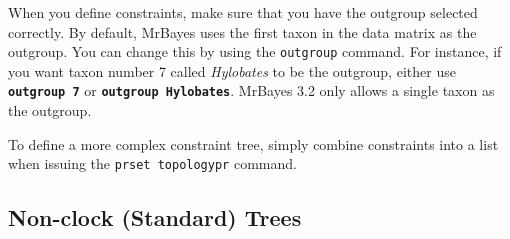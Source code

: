 \documentclass[12pt]{book}
\newcommand{\ttt}[1]{\texttt{#1}}
\newcommand{\tb}[1]{\ttt{\textbf{#1}}}
\begin{document}
When you define constraints, make sure that you have the outgroup selected correctly. By default,
MrBayes uses the first taxon in the data matrix as the outgroup. You can change this by using the
\ttt{outgroup} command. For instance, if you want taxon number 7 called \textit{Hylobates} to be
the outgroup, either use \tb{outgroup 7} or \tb{outgroup Hylobates}. MrBayes 3.2 only allows a
single taxon as the outgroup.

To define a more complex constraint tree, simply combine constraints into a list when issuing the
\ttt{prset topologypr} command.

\subsection{Non-clock (Standard) Trees}
\end{document}

